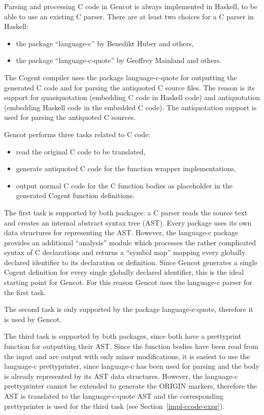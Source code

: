 
Parsing and processing C code in Gencot is always implemented in Haskell, to be able to use an existing
C parser. There are at least two choices for a C parser in Haskell:
\begin{itemize}
\item the package ``language-c'' by Benedikt Huber and others,
\item the package ``language-c-quote'' by Geoffrey Mainland and others.
\end{itemize}

The Cogent compiler uses the package language-c-quote for outputting the generated C code and for parsing the antiquoted
C source files. The reason is its support for quasiquotation (embedding C code in Haskell code) and antiquotation
(embedding Haskell code in the embedded C code). The antiquotation support is used for parsing the antiquoted C sources.

Gencot performs three tasks related to C code:
\begin{itemize}
\item read the original C code to be translated,
\item generate antiquoted C code for the function wrapper implementations,
\item output normal C code for the C function bodies as placeholder in the generated Cogent function definitions.
\end{itemize}

The first task is supported by both packages: a C parser reads the source text and creates an internal abstract syntax tree (AST).
Every package uses its own data structures for representing the AST. However, the language-c package provides an additional
``analysis'' module which processes the rather complicated syntax of C declarations and returns a ``symbol map'' mapping
every globally declared identifier to its declaration or definition. Since Gencot generates a single Cogent definition for
every single globally declared identifier, this is the ideal starting point for Gencot. For this reason Gencot uses
the language-c parser for the first task.

The second task is only supported by the package language-c-quote, therefore it is used by Gencot. 

The third task is supported by both packages, since both have a prettyprint function for outputting their AST. Since the 
function bodies have been read from the input and are output with only minor modifications, it is easiest to use
the language-c prettyprinter, since language-c has been used for parsing and the body is already represented by its 
AST data structures. However, the language-c prettyprinter cannot be extended to generate the ORIGIN markers, therefore
the AST is translated to the language-c-quote AST and the corresponding prettyprinter is used for the third task (see 
Section~\ref{impl-ccode-expr}).

